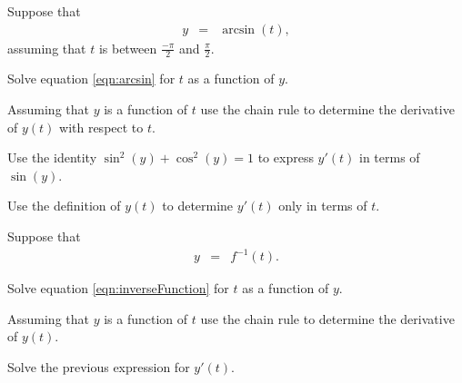 \begin{problem}
\item Suppose that
  \begin{eqnarray}
    \label{eqn:arcsin}
    y &= & \arcsin(t),
  \end{eqnarray}
  assuming that $t$ is between $\frac{-\pi}{2}$ and $\frac{\pi}{2}$.
  \begin{subproblem}
  \item Solve equation \ref{eqn:arcsin} for $t$ as a function of
    $y$.
    \vfill
  \item Assuming that $y$ is a function of $t$ use the chain rule to
    determine the derivative of $y(t)$ with respect to $t$.
    \vfill
  \item Use the identity $\sin^2(y)+\cos^2(y)=1$ to express $y'(t)$ in
    terms of $\sin(y)$.
    \vfill
  \item Use the definition of $y(t)$ to determine $y'(t)$ only in
    terms of $t$.
    \vfill

  \end{subproblem}

  \clearpage

\item Suppose that
  \begin{eqnarray}
    \label{eqn:inverseFunction}
    y &= & f^{-1}(t).
  \end{eqnarray}
  \begin{subproblem}
  \item Solve equation \ref{eqn:inverseFunction} for $t$ as a function
    of $y$.
    \vfill

  \item Assuming that $y$ is a function of $t$ use the chain rule to
    determine the derivative of $y(t)$.
    \vfill

  \item Solve the previous expression for $y'(t)$.
    \vfill

  \end{subproblem}


\end{problem}

\postClass

